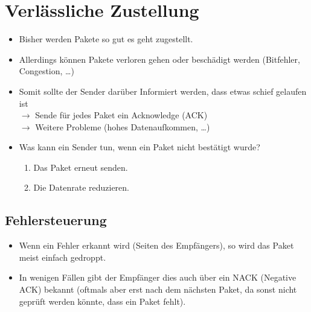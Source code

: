     \section{Verlässliche Zustellung}
        \begin{itemize}
        	\item Bisher werden Pakete so gut es geht zugestellt.
        	\item Allerdings können Pakete verloren gehen oder beschädigt werden (Bitfehler, Congestion, \dots)
        	\item Somit sollte der Sender darüber Informiert werden, dass etwas schief gelaufen ist \\ \(\rightarrow\) Sende für jedes Paket ein Acknowledge (ACK) \\ \(\rightarrow\) Weitere Probleme (hohes Datenaufkommen, \dots)
        	\item Was kann ein Sender tun, wenn ein Paket nicht bestätigt wurde?
	        	\begin{enumerate}
	        		\item Das Paket erneut senden.
	        		\item Die Datenrate reduzieren.
	        	\end{enumerate}
        \end{itemize}

        \subsection{Fehlersteuerung}
            
            \begin{itemize}
            	\item Wenn ein Fehler erkannt wird (Seiten des Empfängers), so wird das Paket meist einfach gedroppt.
            	\item In wenigen Fällen gibt der Empfänger dies auch über ein NACK (Negative ACK) bekannt (oftmals aber erst nach dem nächsten Paket, da sonst nicht geprüft werden könnte, dass ein Paket fehlt).
            \end{itemize}

